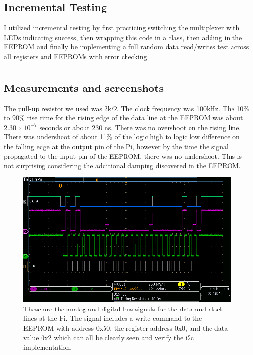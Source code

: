 \documentclass{article}
\begin{document}
\subsection{Incremental Testing}
I utilized incremental testing by first practicing switching the multiplexer with LEDs indicating success, then wrapping this code in a class, then adding in the EEPROM and finally be implementing a full random data read/writes test across all registers and EEPROMs with error checking.

\section{}
\subsection{Measurements and screenshots}
The pull-up resistor we used was 2k$\Omega$.
The clock frequency was 100kHz.
The 10\% to 90\% rise time for the rising edge of the data line at the EEPROM was about $2.30 \times 10^{-7}$ seconds or about 230 ns.
There was no overshoot on the rising line. There was undershoot of about 11\% of the logic high to logic low difference on the falling edge at the output pin of the Pi, however by the time the signal propagated to the input pin of the EEPROM, there was no undershoot. This is not surprising considering the additional damping discovered in the EEPROM.
\begin{figure}[H]
	\centering
	\includegraphics[keepaspectratio,width=.6\linewidth]{./lab_screenshots/tek00001.png}
	\caption{These are the analog and digital bus signals for the data and clock lines at the Pi. The signal includes a write command to the EEPROM with address 0x50, the register address 0x0, and the data value 0x2 which can all be clearly seen and verify the i2c implementation.}
\end{figure}
\end{document}
